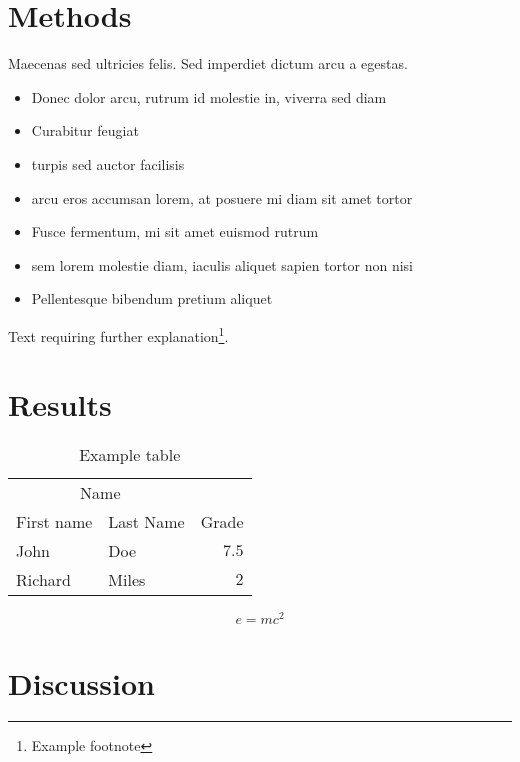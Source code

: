 \documentclass[twoside,twocolumn]{article}
\begin{document}
\section{Methods}

Maecenas sed ultricies felis. Sed imperdiet dictum arcu a egestas. 
\begin{itemize}
\item Donec dolor arcu, rutrum id molestie in, viverra sed diam
\item Curabitur feugiat
\item turpis sed auctor facilisis
\item arcu eros accumsan lorem, at posuere mi diam sit amet tortor
\item Fusce fermentum, mi sit amet euismod rutrum
\item sem lorem molestie diam, iaculis aliquet sapien tortor non nisi
\item Pellentesque bibendum pretium aliquet
\end{itemize}
\blindtext %

Text requiring further explanation\footnote{Example footnote}.


\section{Results}

\begin{table}
\caption{Example table}
\centering
\begin{tabular}{llr}
\toprule
\multicolumn{2}{c}{Name} \\
\cmidrule(r){1-2}
First name & Last Name & Grade \\
\midrule
John & Doe & $7.5$ \\
Richard & Miles & $2$ \\
\bottomrule
\end{tabular}
\end{table}

\blindtext %

\begin{equation}
\label{eq:emc}
e = mc^2
\end{equation}

\blindtext %


\section{Discussion}
\end{document}
